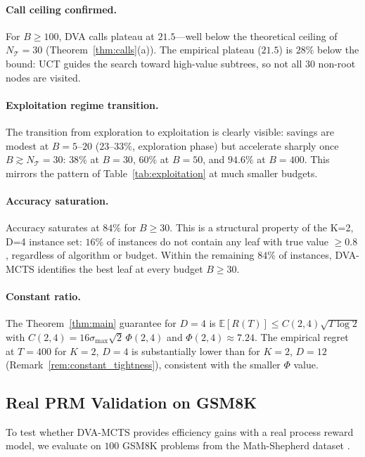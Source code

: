 \paragraph{Call ceiling confirmed.}
For $B \geq 100$, DVA calls plateau at $21.5$---well below the theoretical
ceiling of $N_{\mathcal{T}}{=}30$ (Theorem~\ref{thm:calls}(a)).
The empirical plateau ($21.5$) is $28\%$ below the bound: UCT guides the search
toward high-value subtrees, so not all $30$ non-root nodes are visited.

\paragraph{Exploitation regime transition.}
The transition from exploration to exploitation is clearly visible:
savings are modest at $B{=}5$--$20$ ($23$--$33\%$, exploration phase)
but accelerate sharply once $B \gtrsim N_{\mathcal{T}} = 30$:
$38\%$ at $B{=}30$, $60\%$ at $B{=}50$, and $\mathbf{94.6\%}$ at $B{=}400$.
This mirrors the pattern of Table~\ref{tab:exploitation} at much smaller budgets.

\paragraph{Accuracy saturation.}
Accuracy saturates at $84\%$ for $B \geq 30$.  This is a structural property
of the K=2, D=4 instance set: $16\%$ of instances do not contain any leaf with
true value $\geq 0.8$, regardless of algorithm or budget.  Within the remaining
$84\%$ of instances, DVA-MCTS identifies the best leaf at every budget $B \geq 30$.

\paragraph{Constant ratio.}
The Theorem~\ref{thm:main} guarantee for $D{=}4$ is
$\mathbb{E}[R(T)] \leq C(2,4)\sqrt{T \log 2}$ with
$C(2,4) = 16\sigma_{\max}\sqrt{2}\,\Phi(2,4)$ and $\Phi(2,4) \approx 7.24$.
The empirical regret at $T{=}400$ for $K{=}2$, $D{=}4$ is substantially lower
than for $K{=}2$, $D{=}12$ (Remark~\ref{rem:constant_tightness}), consistent with
the smaller $\Phi$ value.

\subsection{Real PRM Validation on GSM8K}
\label{sec:gsm8k}

To test whether DVA-MCTS provides efficiency gains with a real process reward model,
we evaluate on $100$ GSM8K problems from the Math-Shepherd dataset
\citep{wang2024math}.

